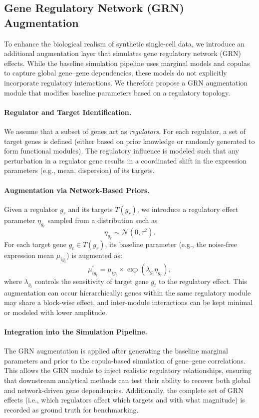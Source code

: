 \documentclass{article}
\begin{document}
\subsection{Gene Regulatory Network (GRN) Augmentation}
\label{sec:grn_augmentation}

To enhance the biological realism of synthetic single-cell data, we introduce an additional augmentation layer that simulates gene regulatory network (GRN) effects. While the baseline simulation pipeline uses marginal models and copulas to capture global gene--gene dependencies, these models do not explicitly incorporate regulatory interactions. We therefore propose a GRN augmentation module that modifies baseline parameters based on a regulatory topology.

\paragraph{Regulator and Target Identification.}
We assume that a subset of genes act as \emph{regulators}. For each regulator, a set of target genes is defined (either based on prior knowledge or randomly generated to form functional modules). The regulatory influence is modeled such that any perturbation in a regulator gene results in a coordinated shift in the expression parameters (e.g., mean, dispersion) of its targets.

\paragraph{Augmentation via Network-Based Priors.}
Given a regulator \(g_r\) and its targets \(T(g_r)\), we introduce a regulatory effect parameter \(\eta_{g_r}\) sampled from a distribution such as 
\[
\eta_{g_r} \sim \mathcal{N}(0,\tau^2).
\]
For each target gene \(g_t \in T(g_r)\), its baseline parameter (e.g., the noise-free expression mean \(\mu_{ig_t}\)) is augmented as:
\[
\mu_{ig_t}^{\prime} = \mu_{ig_t} \times \exp\left( \lambda_{g_t}\eta_{g_r}\right),
\]
where \(\lambda_{g_t}\) controls the sensitivity of target gene \(g_t\) to the regulatory effect. This augmentation can occur hierarchically: genes within the same regulatory module may share a block-wise effect, and inter-module interactions can be kept minimal or modeled with lower amplitude.

\paragraph{Integration into the Simulation Pipeline.}
The GRN augmentation is applied after generating the baseline marginal parameters and prior to the copula-based simulation of gene--gene correlations. This allows the GRN module to inject realistic regulatory relationships, ensuring that downstream analytical methods can test their ability to recover both global and network-driven gene dependencies. Additionally, the complete set of GRN effects (i.e., which regulators affect which targets and with what magnitude) is recorded as ground truth for benchmarking.
\end{document}
